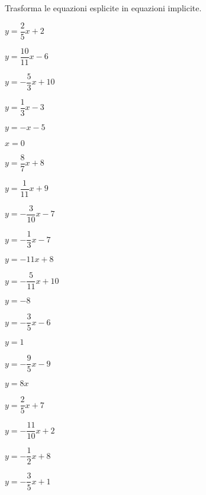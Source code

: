 \begin{esercizio}\label{ese:}
 Trasforma le equazioni esplicite in equazioni implicite.
 \begin{multicols}{3}
 \begin{enumeratea}
  \item  \(y = \dfrac{2}{5} x +2\)
  \item  \(y = \dfrac{10}{11} x -6\)
  \item  \(y = -\dfrac{5}{3} x +10\)
  \item  \(y = \dfrac{1}{3} x -3\)
  \item  \(y = - x -5\)
  \item  \(x = 0\)
  \item  \(y = \dfrac{8}{7} x +8\)
  \item  \(y = \dfrac{1}{11} x +9\)
  \item  \(y = -\dfrac{3}{10} x -7\)
  \item  \(y = -\dfrac{1}{3} x -7\)
  \item  \(y = -11 x +8\)
  \item  \(y = -\dfrac{5}{11} x +10\)
  \item  \(y = -8\)
  \item  \(y = -\dfrac{3}{5} x -6\)
  \item  \(y = 1\)
  \item  \(y = -\dfrac{9}{5} x -9\)
  \item  \(y = 8 x \)
  \item  \(y = \dfrac{2}{5} x +7\)
  \item  \(y = -\dfrac{11}{10} x +2\)
  \item  \(y = -\dfrac{1}{2} x +8\)
  \item  \(y = -\dfrac{3}{5} x +1\)
 \end{enumeratea}
 \end{multicols}
\end{esercizio}

\subsubsection*{}

